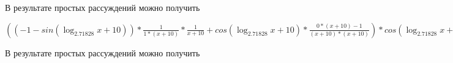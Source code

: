 \documentclass[12pt,a4paper,fleqn]{article}
\theoremstyle{definition}
\begin{document}
В результате простых рассуждений можно получить

$(( -1  - sin(\log_{ 2.71828 }{ x  +  10 })) * \frac{ 1 }{ 1  * ( x  +  10 )}
 * \frac{ 1 }{ x  +  10 }
 + cos(\log_{ 2.71828 }{ x  +  10 }) * \frac{ 0  * ( x  +  10 ) -  1 }{( x  +  10 ) * ( x  +  10 )}
) * cos(\log_{ 2.71828 }{ x  +  10 }) * \frac{ 1 }{ x  +  10 }
 * { 3 }^{sin(\log_{ 2.71828 }{ x  +  10 })} + cos(\log_{ 2.71828 }{ x  +  10 }) * \frac{ 1 }{ x  +  10 }
 * ((( -1  - sin(\log_{ 2.71828 }{ x  +  10 })) * \frac{ 1 }{ 1  * ( x  +  10 )}
 * \frac{ 1 }{ x  +  10 }
 + cos(\log_{ 2.71828 }{ x  +  10 }) * \frac{ 0  * ( x  +  10 ) -  1 }{( x  +  10 ) * ( x  +  10 )}
) * { 3 }^{sin(\log_{ 2.71828 }{ x  +  10 })} + cos(\log_{ 2.71828 }{ x  +  10 }) * \frac{ 1 }{ x  +  10 }
 *  1  * cos(\log_{ 2.71828 }{ x  +  10 }) * \frac{ 1 }{ 1  * ( x  +  10 )}
 * { 3 }^{sin(\log_{ 2.71828 }{ x  +  10 })}) = (( -1  - sin(\log_{ 2.71828 }{ x  +  10 })) * \frac{ 1 }{ 1  * ( x  +  10 )}
 * \frac{ 1 }{ x  +  10 }
 + cos(\log_{ 2.71828 }{ x  +  10 }) * \frac{ 0  * ( x  +  10 ) -  1 }{( x  +  10 ) * ( x  +  10 )}
) * cos(\log_{ 2.71828 }{ x  +  10 }) * \frac{ 1 }{ x  +  10 }
 * { 3 }^{sin(\log_{ 2.71828 }{ x  +  10 })} + cos(\log_{ 2.71828 }{ x  +  10 }) * \frac{ 1 }{ x  +  10 }
 * ((( -1  - sin(\log_{ 2.71828 }{ x  +  10 })) * \frac{ 1 }{ 1  * ( x  +  10 )}
 * \frac{ 1 }{ x  +  10 }
 + cos(\log_{ 2.71828 }{ x  +  10 }) * \frac{ 0  * ( x  +  10 ) -  1 }{( x  +  10 ) * ( x  +  10 )}
) * { 3 }^{sin(\log_{ 2.71828 }{ x  +  10 })} + cos(\log_{ 2.71828 }{ x  +  10 }) * \frac{ 1 }{ x  +  10 }
 *  1  * cos(\log_{ 2.71828 }{ x  +  10 }) * \frac{ 1 }{ 1  * ( x  +  10 )}
 * { 3 }^{sin(\log_{ 2.71828 }{ x  +  10 })})$

В результате простых рассуждений можно получить
\end{document}
